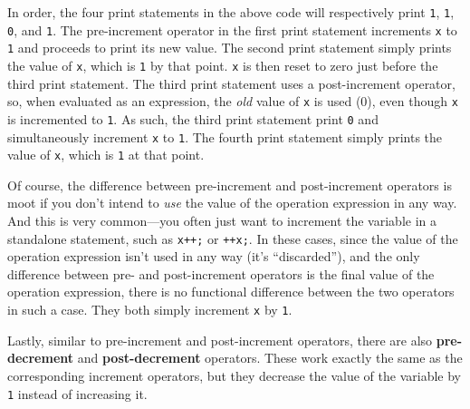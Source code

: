 \documentclass{article}
\begin{document}
In order, the four print statements in the above code will respectively print \texttt{1}, \texttt{1}, \texttt{0}, and \texttt{1}. The pre-increment operator in the first print statement increments \texttt{x} to \texttt{1} and proceeds to print its new value. The second print statement simply prints the value of \texttt{x}, which is \texttt{1} by that point. \texttt{x} is then reset to zero just before the third print statement. The third print statement uses a post-increment operator, so, when evaluated as an expression, the \textit{old} value of \texttt{x} is used (0), even though \texttt{x} is incremented to \texttt{1}. As such, the third print statement print \texttt{0} and simultaneously increment \texttt{x} to \texttt{1}. The fourth print statement simply prints the value of \texttt{x}, which is \texttt{1} at that point.

Of course, the difference between pre-increment and post-increment operators is moot if you don't intend to \textit{use} the value of the operation expression in any way. And this is very common---you often just want to increment the variable in a standalone statement, such as \texttt{x++;} or \texttt{++x;}. In these cases, since the value of the operation expression isn't used in any way (it's ``discarded''), and the only difference between pre- and post-increment operators is the final value of the operation expression, there is no functional difference between the two operators in such a case. They both simply increment \texttt{x} by \texttt{1}.

Lastly, similar to pre-increment and post-increment operators, there are also \textbf{pre-decrement} and \textbf{post-decrement} operators. These work exactly the same as the corresponding increment operators, but they decrease the value of the variable by \texttt{1} instead of increasing it.
\end{document}

